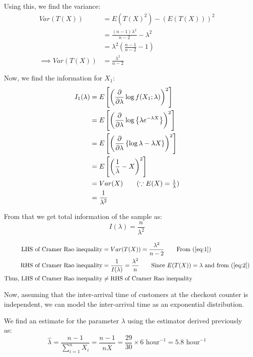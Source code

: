 \documentclass[12pt, oneside]{article}
\begin{document}
\begin{enumerate}
{  Using this, we find the variance:
  \begin{align}
    Var(T(X)) &= E(T(X)^2) - (E(T(X)))^2 \nonumber\\
      &= \frac{(n - 1) \lambda^2}{n - 2} - \lambda^2 \nonumber\\
      &= \lambda^2 \left(\frac{n-1}{n-2} - 1\right) \nonumber\\
    \implies Var(T(X)) &= \frac{\lambda^2}{n - 2} \label{eq:1}
  \end{align}

  Now, we find the information for \(X_1\):
  \begin{align*}
    I_1(\lambda) &= E\left[\left(\frac{\partial}{\partial\lambda} \log f(X_1; \lambda)\right)^2\right] \\
      &= E\left[\left(\frac{\partial}{\partial\lambda} \log\left\{\lambda e^{-\lambda X}\right\}\right)^2\right] \\
      &= E\left[\left(\frac{\partial}{\partial\lambda} \left\{\log{\lambda} - \lambda X\right\} \right)^2\right] \\
      &= E\left[\left(\frac{1}{\lambda} - X\right)^2\right] \\
      &= Var(X) \tag*{(\(\because E(X) = \frac{1}{\lambda}\))}\\
      &= \frac{1}{\lambda^2}
  \end{align*}

  From that we get total information of the sample as:
  \begin{equation}
    I(\lambda) = \frac{n}{\lambda^2} \label{eq:2}
  \end{equation}

  \begin{align*}
    \text{LHS of Cramer Rao inequality} &= Var(T(X)) = \frac{\lambda^2}{n - 2} \tag*{From (\ref{eq:1})} \\
    \text{RHS of Cramer Rao inequality} &= \frac{1}{I(\lambda)} = \frac{\lambda^2}{n} \tag*{Since \(E(T(X)) = \lambda\) and from (\ref{eq:2})} \\
    \text{Thus, LHS of Cramer Rao inequality} &\neq \text{RHS of Cramer Rao inequality}
  \end{align*}

  Now, assuming that the inter-arrival time of customers at the checkout counter is independent,
  we can model the inter-arrival time as an exponential distribution.

  We find an estimate for the parameter \(\lambda\) using the estimator derived previously as:
  \[\widehat{\lambda} = \frac{n - 1}{\sum_{i=1}^{n} X_i} = \frac{n - 1}{n \overline{X}} = \frac{29}{30} \times 6 \text{ hour}^{-1} = 5.8 \text{ hour}^{-1}\]

}
\end{enumerate}
\end{document}
